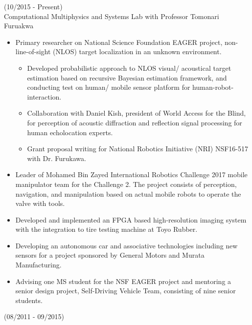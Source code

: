 \documentclass[11pt,letterpaper]{article}
\begin{document}
  \hfill {(10/2015 - Present)}\\
  Computational Multiphysics and Systems Lab with Professor Tomonari Furuakwa\\
  \begin{itemize}
  	\item Primary researcher on National Science Foundation EAGER project, non-line-of-sight (NLOS) target localization in an unknown environment.
  	\begin{itemize}
  		\item Developed probabilistic approach to NLOS visual/ acoustical target estimation based on recursive Bayesian estimation framework, and conducting test on human/ mobile sensor platform for human-robot-interaction.
  		\item Collaboration with Daniel Kish, president of World Access for the Blind, for perception of acoustic diffraction and reflection signal processing for human echolocation experts.
  		\item Grant proposal writing for National Robotics Initiative (NRI) NSF16-517 with Dr. Furukawa.
  	\end{itemize}
  	\item Leader of Mohamed Bin Zayed International Robotics Challenge 2017 mobile manipulator team for the Challenge 2. The project consists of perception, navigation, and manipulation based on actual mobile robots to operate the valve with tools.
  	\item Developed and implemented an FPGA based high-resolution imaging system with the integration to tire testing machine at Toyo Rubber.
  	\item Developing an autonomous car and associative technologies including new sensors for a project sponsored by General Motors and Murata Manufacturing. \item Advising one MS student for the NSF EAGER project and mentoring a senior design project, Self-Driving Vehicle Team, consisting of nine senior students.
  \end{itemize}
  \hfill {(08/2011 - 09/2015)}\\
\end{document}
